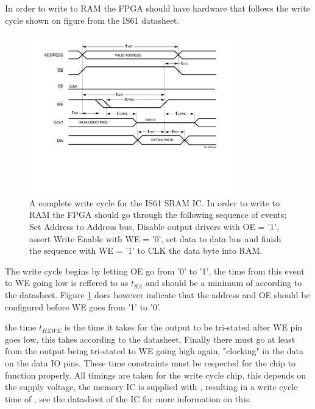 In order to write to RAM the FPGA should have hardware that follows the write cycle shown on figure  from the IS61 datasheet.
\begin{figure}[H]
    \centering
    \includegraphics[clip, trim=0 150 0 0, width=0.8\textwidth]{Sections/7_SystemDesign/Figures/7_2_5_IS61_WriteCycle.pdf}
    \caption{A complete write cycle for the IS61 SRAM IC\cite{ISSISRAM}. In order to write to RAM the FPGA should go through the following sequence of events; Set Address to Address bus, Disable output drivers with OE = '1', assert Write Enable with WE = '0', set data to data bus and finish the sequence with WE = '1' to CLK the data byte into RAM.}
    \label{fig:7_2_5_IS61_WRITE}
\end{figure}

The write cycle begins by letting OE go from '0' to '1', the time from this event to WE going low is reffered to as $t_{SA}$ and should be a minimum of  according to the datasheet. Figure \ref{fig:7_2_5_IS61_WRITE} does however indicate that the address and OE should be configured before WE goes from '1' to '0'.

the time $t_{HZWE}$ is the time it takes for the output to be tri-stated after WE pin goes low, this takes  according to the datasheet. Finally there must go at least  from the output being tri-stated to WE going high again, "clocking" in the data on the data IO pins. These time constraints must be respected for the chip to function properly. All timings are taken for the  write cycle chip, this depends on the supply voltage, the memory IC is supplied with , resulting in a write cycle time of , see the datasheet of the IC for more information on this.

